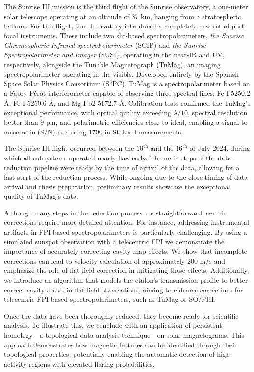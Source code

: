 \documentclass[12pt]{mythesis}
\begin{document}
The Sunrise III mission is the third flight of the Sunrise observatory, a one-meter solar telescope operating at an altitude of 37 km, hanging from a stratospheric balloon. For this flight, the observatory introduced a completely new set of post-focal instruments. These include two slit-based spectropolarimeters, \textit{the Sunrise Chromospheric Infrared spectroPolarimeter} (SCIP) and \textit{the Sunrise Spectropolarimeter and Imager} (SUSI), operating in the near-IR and UV, respectively, alongside the Tunable Magnetograph (TuMag), an imaging spectropolarimeter operating in the visible. Developed entirely by the Spanish Space Solar Physics Consortium (S$^3$PC), TuMag is a spectropolarimeter based on a Fabry-Pérot interferometer capable of observing three spectral lines: Fe I 5250.2 Å, Fe I 5250.6 Å, and Mg I b2 5172.7 Å. Calibration tests confirmed the TuMag’s exceptional performance, with optical quality exceeding $\lambda/10$, spectral resolution better than 9 pm, and polarimetric efficiencies close to ideal, enabling a signal-to-noise ratio (S/N) exceeding 1700 in Stokes I measurements.

The Sunrise III flight occurred between the $10^{\text{th}}$ and the $16^{\text{th}}$ of July 2024, during which all subsystems operated nearly flawlessly. The main steps of the data-reduction pipeline were ready by the time of arrival of the data, allowing for a fast start of the reduction process. While ongoing due to the close timing of data arrival and thesis preparation, preliminary results showcase the exceptional quality of TuMag’s data.

Although many steps in the reduction process are straightforward, certain corrections require more detailed attention. For instance, addressing instrumental artifacts in FPI-based spectropolarimeters is particularly challenging. By using a simulated sunspot observation with a telecentric FPI we demonstrate the importance of accurately correcting cavity map effects. We show that incomplete corrections can lead to velocity calculation of approximately 200 m/s and emphasize the role of flat-field correction in mitigating these effects. Additionally, we introduce an algorithm that models the etalon's transmission profile to better correct cavity errors in flat-field observations, aiming to enhance corrections for telecentric FPI-based spectropolarimeters, such as TuMag or SO/PHI.

Once the data have been thoroughly reduced, they become ready for scientific analysis. To illustrate this, we conclude with an application of persistent homology—a topological data analysis technique—on solar magnetograms. This approach demonstrates how magnetic features can be identified through their topological properties, potentially enabling the automatic detection of high-activity regions with elevated flaring probabilities.
\end{document}
